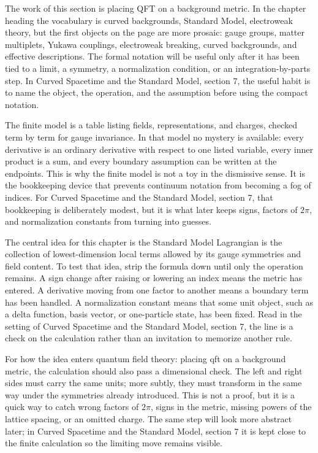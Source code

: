 The work of this section is placing QFT on a background metric.  In the chapter heading the vocabulary is curved backgrounds, Standard Model, electroweak theory, but the first objects on the page are more prosaic: gauge groups, matter multiplets, Yukawa couplings, electroweak breaking, curved backgrounds, and effective descriptions.  The formal notation will be useful only after it has been tied to a limit, a symmetry, a normalization condition, or an integration-by-parts step.  In Curved Spacetime and the Standard Model, section 7, the useful habit is to name the object, the operation, and the assumption before using the compact notation.

The finite model is a table listing fields, representations, and charges, checked term by term for gauge invariance.  In that model no mystery is available: every derivative is an ordinary derivative with respect to one listed variable, every inner product is a sum, and every boundary assumption can be written at the endpoints.  This is why the finite model is not a toy in the dismissive sense.  It is the bookkeeping device that prevents continuum notation from becoming a fog of indices.  For Curved Spacetime and the Standard Model, section 7, that bookkeeping is deliberately modest, but it is what later keeps signs, factors of \(2\pi\), and normalization constants from turning into guesses.

The central idea for this chapter is the Standard Model Lagrangian is the collection of lowest-dimension local terms allowed by its gauge symmetries and field content.  To test that idea, strip the formula down until only the operation remains.  A sign change after raising or lowering an index means the metric has entered.  A derivative moving from one factor to another means a boundary term has been handled.  A normalization constant means that some unit object, such as a delta function, basis vector, or one-particle state, has been fixed.  Read in the setting of Curved Spacetime and the Standard Model, section 7, the line is a check on the calculation rather than an invitation to memorize another rule.

For how the idea enters quantum field theory: placing qft on a background metric, the calculation should also pass a dimensional check.  The left and right sides must carry the same units; more subtly, they must transform in the same way under the symmetries already introduced.  This is not a proof, but it is a quick way to catch wrong factors of \(2\pi\), signs in the metric, missing powers of the lattice spacing, or an omitted charge.  The same step will look more abstract later; in Curved Spacetime and the Standard Model, section 7 it is kept close to the finite calculation so the limiting move remains visible.

